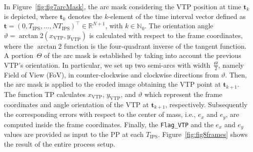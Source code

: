 \documentclass[a4paper,twocolumn,10pt]{article}
\begin{document}
    In Figure~\ref{fig:fig7arcMask}, the arc mask considering the VTP position at time $\mathbf{t}_k$ 
    is depicted, where $\mathbf{t}_k$ denotes the $k$-element of the time interval vector defined as 
    $\mathbf{t} =(0, T_\mathrm{IPS}, \dots, NT_\mathrm{IPS})^\top \in \mathbb{R}^{N+1}$, with $k \in 
    \mathbb{N}_0$. The orientation angle \mbox{$\vartheta = \arctan$2$(x_\mathrm{VTP},y_\mathrm{VTP})$} 
    is calculated with respect to the frame coordinates, where the $\arctan$2 function is the 
    four-quadrant inverse of the tangent function. A portion~$\varTheta$ of the arc mask is established 
    by taking into account the previous VTP's orientation. In particular, we set up two semi-arcs 
    with width~$\frac{\varTheta}{2}$, namely Field of View (FoV), in counter-clockwise and clockwise 
    directions from $\vartheta$. Then, the arc mask is applied to the eroded image obtaining 
    the VTP point at $\mathbf{t}_{k+1}$. The function TP calculates $x_\mathrm{VTP}$, 
    $y_\mathrm{VTP}$, and $\vartheta$ which represent the frame coordinates and angle orientation of 
    the VTP at  $\mathbf{t}_{k+1}$, respectively. Subsequently the corresponding errors with 
    respect to the center of mass, i.e., $e_x$ and $e_y$, are computed inside the frame coordinates. 
    Finally, the \texttt{Flag\_VTP} and the $e_x$ and $e_y$ values are provided as input to the PP 
    at each $T_\mathrm{IPS}$. Figure~\ref{fig:fig8frames} shows the result of the entire process setup. 
\end{document}
